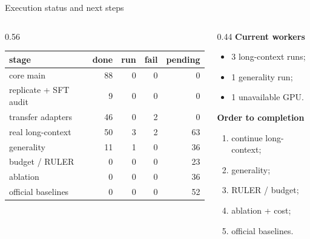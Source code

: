\begin{frame}{Execution status and next steps}
  \begin{columns}[T]
  \begin{column}{0.56\textwidth}
    \centering\scriptsize
    \begin{tabular}{lrrrr}
    \toprule
    stage & done & run & fail & pending \\
    \midrule
    core main & 88 & 0 & 0 & 0 \\
    replicate + SFT audit & 9 & 0 & 0 & 0 \\
    transfer adapters & 46 & 0 & 2 & 0 \\
    real long-context & 50 & 3 & 2 & 63 \\
    generality & 11 & 1 & 0 & 36 \\
    budget / RULER & 0 & 0 & 0 & 23 \\
    ablation & 0 & 0 & 0 & 36 \\
    official baselines & 0 & 0 & 0 & 52 \\
    \bottomrule
    \end{tabular}
  \end{column}
  \begin{column}{0.44\textwidth}
    \textbf{Current workers}
    \begin{itemize}\scriptsize
      \item 3 long-context runs;
      \item 1 generality run;
      \item 1 unavailable GPU.
    \end{itemize}
    \textbf{Order to completion}
    \begin{enumerate}\scriptsize
      \item continue long-context;
      \item generality;
      \item RULER / budget;
      \item ablation + cost;
      \item official baselines.
    \end{enumerate}
  \end{column}
  \end{columns}
\end{frame}
